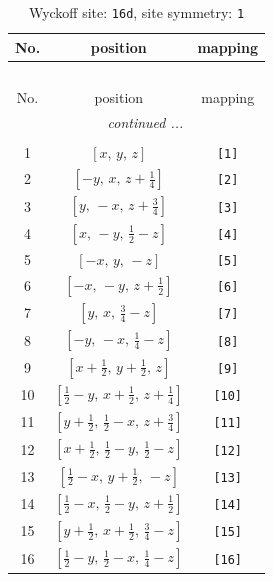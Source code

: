 \documentclass[fleqn,8pt]{jsarticle}
\begin{document}
\begin{longtable}{ccc}
\caption{Wyckoff site: {\tt 16d}, site symmetry: {\tt 1}}
 \\
 \hline \hline
No. & position & mapping \\ \hline \endfirsthead

\multicolumn{2}{l}{\tablename\ \thetable{}} \\
 \hline \hline
No. & position & mapping \\ \hline \endhead

 \hline \hline
\multicolumn{2}{r}{\footnotesize\it continued ...} \\ \endfoot

 \hline \hline
\multicolumn{2}{r}{} \\ \endlastfoot

1 & $\left[ x,\, y,\, z \right]$ & {\tt [1]} \\ \hline
2 & $\left[ - y,\, x,\, z + \frac{1}{4} \right]$ & {\tt [2]} \\ \hline
3 & $\left[ y,\, - x,\, z + \frac{3}{4} \right]$ & {\tt [3]} \\ \hline
4 & $\left[ x,\, - y,\, \frac{1}{2} - z \right]$ & {\tt [4]} \\ \hline
5 & $\left[ - x,\, y,\, - z \right]$ & {\tt [5]} \\ \hline
6 & $\left[ - x,\, - y,\, z + \frac{1}{2} \right]$ & {\tt [6]} \\ \hline
7 & $\left[ y,\, x,\, \frac{3}{4} - z \right]$ & {\tt [7]} \\ \hline
8 & $\left[ - y,\, - x,\, \frac{1}{4} - z \right]$ & {\tt [8]} \\ \hline
9 & $\left[ x + \frac{1}{2},\, y + \frac{1}{2},\, z \right]$ & {\tt [9]} \\ \hline
10 & $\left[ \frac{1}{2} - y,\, x + \frac{1}{2},\, z + \frac{1}{4} \right]$ & {\tt [10]} \\ \hline
11 & $\left[ y + \frac{1}{2},\, \frac{1}{2} - x,\, z + \frac{3}{4} \right]$ & {\tt [11]} \\ \hline
12 & $\left[ x + \frac{1}{2},\, \frac{1}{2} - y,\, \frac{1}{2} - z \right]$ & {\tt [12]} \\ \hline
13 & $\left[ \frac{1}{2} - x,\, y + \frac{1}{2},\, - z \right]$ & {\tt [13]} \\ \hline
14 & $\left[ \frac{1}{2} - x,\, \frac{1}{2} - y,\, z + \frac{1}{2} \right]$ & {\tt [14]} \\ \hline
15 & $\left[ y + \frac{1}{2},\, x + \frac{1}{2},\, \frac{3}{4} - z \right]$ & {\tt [15]} \\ \hline
16 & $\left[ \frac{1}{2} - y,\, \frac{1}{2} - x,\, \frac{1}{4} - z \right]$ & {\tt [16]} \\
\end{longtable}
\end{document}

